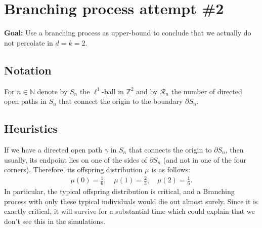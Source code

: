 \documentclass{article}
\newcommand{\N}{\mathbb{N}}
\theoremstyle{definition}
\newcommand{\1}{\mathbbm{1}}
\newcommand{\0}{\mathbf{o}}
\newcommand{\Z}{\mathbb{Z}}
\begin{document}

\newpage 
\section{Branching process attempt \#2}
\textbf{Goal:} Use a branching process as upper-bound to conclude that we actually do not percolate in $d=k=2$. 

\subsection{Notation}
For $n \in \N$ denote by $S_n$ the $\ell^1$-ball in $\Z^2$ and by $\mathcal{R}_n$ the number of directed open paths in $S_n$ that connect the origin to the boundary $\partial S_n$.

\subsection{Heuristics}
If we have a directed open path $\gamma$ in $S_n$ that connects the origin to $\partial S_n$, then usually, its endpoint lies on one of the sides of $\partial S_n$ (and not in one of the four corners). Therefore, its offspring distribution $\mu$ is as follows: 
\begin{align*}
    \mu(0) = \frac{1}{6}, \quad \mu(1) = \frac{2}{3}, \quad \mu(2) = \frac{1}{6}.
\end{align*}
In particular, the typical offspring distribution is critical, and a Branching process with only these typical individuals would die out almost surely. Since it is exactly critical, it will survive for a substantial time which could explain that we don't see this in the simulations. 
\end{document}
